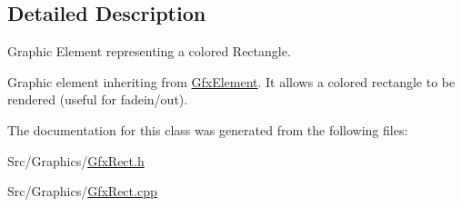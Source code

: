 \subsection{Detailed Description}
Graphic Element representing a colored Rectangle. 

Graphic element inheriting from \hyperlink{classGfxElement}{Gfx\-Element}. It allows a colored rectangle to be rendered (useful for fadein/out). 

The documentation for this class was generated from the following files\-:\begin{DoxyCompactItemize}
\item 
Src/\-Graphics/\hyperlink{GfxRect_8h}{Gfx\-Rect.\-h}\item 
Src/\-Graphics/\hyperlink{GfxRect_8cpp}{Gfx\-Rect.\-cpp}\end{DoxyCompactItemize}
